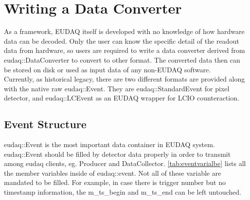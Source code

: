 \section{Writing a Data Converter}
As a framework, EUDAQ itself is developed with no knowledge of how hardware data can be decoded. Only the user can know the specific detail of the readout data from hardware, so users are required to write a data converter derived from eudaq::DataConverter to convert to other format. The converted data then can be stored on disk or used as input data of any non-EUDAQ software.\\

Currently, as historical legacy, there are two different formats are provided along with the native raw eudaq::Event. They are eudaq::StandardEvent for pixel detector, and eudaq::LCEvent as an EUDAQ wrapper for LCIO counteraction.

\subsection{Event Structure}
eudaq::Event is the most important data container in EUDAQ system. eudaq::Event should be filled by detector data properly in order to transmit among eudaq clients, eg. Producer and DataCollector. \autoref{tab:eventvarialbe} lists all the member variables inside of eudaq::event. Not all of these variable are mandated to be filled. For example, in case there is trigger number but no timestamp information, the m\_ts\_begin and m\_ts\_end can be left untouched.

